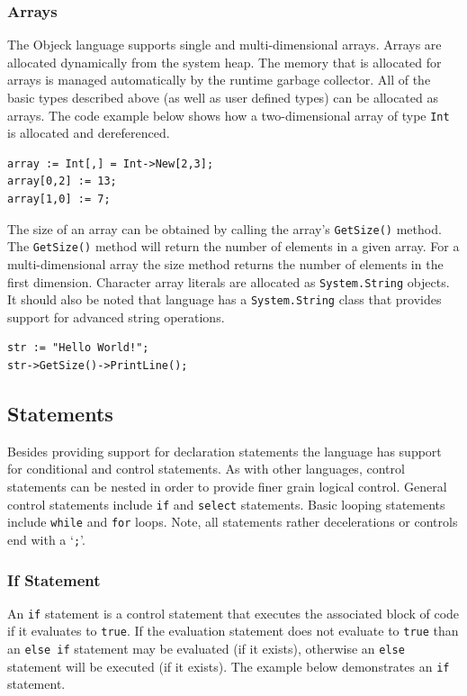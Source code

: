 \documentclass[12pt]{article}
\begin{document}
\subsubsection{Arrays}
The Objeck language supports single and multi-dimensional arrays.  Arrays are allocated dynamically from the system heap.  The memory that is allocated for arrays is managed automatically by the runtime garbage collector.  All of the basic types described above (as well as user defined types) can be allocated as arrays.  The code example below shows how a two-dimensional array of type \texttt{Int} is allocated and dereferenced.


\begin{verbatim}
array := Int[,] = Int->New[2,3];
array[0,2] := 13;
array[1,0] := 7;
\end{verbatim}

The size of an array can be obtained by calling the array's \texttt{GetSize()} method.  The \texttt{GetSize()} method will return the number of elements in a given array.  For a multi-dimensional array the size method returns the number of elements in the first dimension.  Character array literals are allocated as \texttt{System.String} objects.  It should also be noted that language has a \texttt{System.String} class that provides support for advanced string operations.

\begin{verbatim}
str := "Hello World!";
str->GetSize()->PrintLine();
\end{verbatim}

\subsection{Statements}
Besides providing support for declaration statements the language has support for conditional and control statements.  As with other languages, control statements can be nested in order to provide finer grain logical control. General control statements include \texttt{if} and \texttt{select} statements. Basic looping statements include \texttt{while} and \texttt{for} loops.  Note, all statements rather decelerations or controls end with a `\texttt{;}'.

\subsubsection{If Statement}

An \texttt{if} statement is a control statement that executes the associated block of code if it evaluates to \texttt{true}.  If the evaluation statement does not evaluate to \texttt{true} than an \texttt{else if} statement may be evaluated (if it exists), otherwise an \texttt{else} statement will be executed (if it exists).  The example below demonstrates an \texttt{if} statement.
\end{document}
